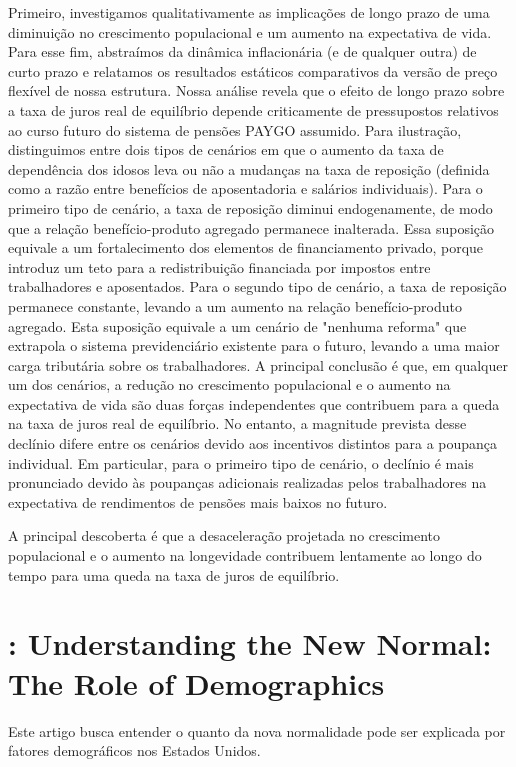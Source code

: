 Primeiro, investigamos qualitativamente as implicações de longo prazo de uma diminuição no crescimento populacional e um aumento na expectativa de vida. Para esse fim, abstraímos da dinâmica inflacionária (e de qualquer outra) de curto prazo e relatamos os resultados estáticos comparativos da versão de preço flexível de nossa estrutura. Nossa análise revela que o efeito de longo prazo sobre a taxa de juros real de equilíbrio depende criticamente de
pressupostos relativos ao curso futuro do sistema de pensões PAYGO assumido. Para ilustração, distinguimos entre dois tipos de cenários em que o aumento da taxa de dependência dos idosos leva ou não a mudanças na taxa de reposição (definida como a razão entre benefícios de aposentadoria e salários individuais). Para o primeiro tipo de cenário, a taxa de reposição diminui endogenamente, de modo que a relação benefício-produto agregado permanece inalterada. Essa suposição equivale a um fortalecimento dos elementos de financiamento privado, porque introduz um teto para a redistribuição financiada por impostos entre trabalhadores e aposentados. Para o segundo tipo de cenário, a taxa de reposição permanece constante, levando a um aumento na relação benefício-produto agregado. Esta suposição equivale a um cenário de "nenhuma reforma" que extrapola o sistema previdenciário existente para o futuro, levando a uma maior carga tributária sobre os trabalhadores. A principal conclusão é que, em qualquer um dos cenários, a redução no crescimento populacional e o aumento na expectativa de vida são duas forças independentes que contribuem para a queda na taxa de juros real de equilíbrio. No entanto, a magnitude prevista desse declínio difere entre os cenários devido aos incentivos distintos para a poupança individual. Em particular, para o primeiro tipo de cenário, o declínio é mais pronunciado devido às poupanças adicionais realizadas pelos trabalhadores na expectativa de rendimentos de pensões mais baixos no futuro.

A principal descoberta é que a desaceleração projetada no crescimento populacional e o aumento na longevidade contribuem lentamente ao longo do tempo para uma queda na taxa de juros de equilíbrio.
%
%
\section{\citet{Gagnon:2016}: Understanding the New Normal: The Role of Demographics}
Este artigo busca entender o quanto da nova normalidade pode ser explicada por fatores demográficos nos Estados Unidos.

